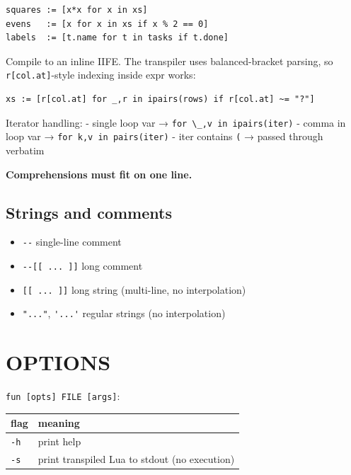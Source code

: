 \documentclass[10pt,twocolumn]{article}
\newcounter{none}
\providecommand{\passthrough}[1]{#1}
\providecommand{\tightlist}{\setlength{\itemsep}{0pt}\setlength{\parskip}{0pt}}
\begin{document}
\begin{lstlisting}[language=Fun]
squares := [x*x for x in xs]
evens   := [x for x in xs if x % 2 == 0]
labels  := [t.name for t in tasks if t.done]
\end{lstlisting}

Compile to an inline IIFE. The transpiler uses balanced-bracket parsing,
so \passthrough{\lstinline!r[col.at]!}-style indexing inside expr works:

\begin{lstlisting}[language=Fun]
xs := [r[col.at] for _,r in ipairs(rows) if r[col.at] ~= "?"]
\end{lstlisting}

Iterator handling: - single loop var →
\passthrough{\lstinline!for \_,v in ipairs(iter)!} - comma in loop var →
\passthrough{\lstinline!for k,v in pairs(iter)!} - iter contains
\passthrough{\lstinline!(!} → passed through verbatim

\textbf{Comprehensions must fit on one line.}

\subsection{Strings and comments}\label{strings-and-comments}

\begin{itemize}
\tightlist
\item
  \passthrough{\lstinline!--!} single-line comment
\item
  \passthrough{\lstinline!--[[ ... ]]!} long comment
\item
  \passthrough{\lstinline![[ ... ]]!} long string (multi-line, no
  interpolation)
\item
  \passthrough{\lstinline!"..."!}, \passthrough{\lstinline!'...'!}
  regular strings (no interpolation)
\end{itemize}

\section{OPTIONS}\label{options}

\passthrough{\lstinline!fun [opts] FILE [args]!}:

{\def\LTcaptype{none} %
\begin{longtable}[]{@{}ll@{}}
\toprule\noalign{}
flag & meaning \\
\midrule\noalign{}
\endhead
\bottomrule\noalign{}
\endlastfoot
\passthrough{\lstinline!-h!} & print help \\
\passthrough{\lstinline!-s!} & print transpiled Lua to stdout (no
execution) \\
\end{longtable}
}
\end{document}
